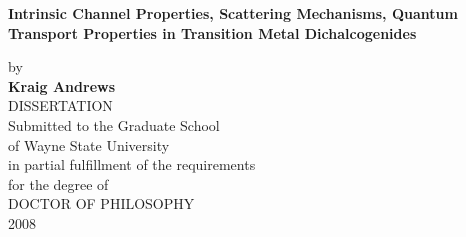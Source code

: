\setcounter{page}{1} 
\thispagestyle{empty}
\begin{titlepage}


	\begin{center}

	\singlespacing
	\textbf{Intrinsic Channel Properties, Scattering Mechanisms, Quantum Transport Properties in Transition Metal Dichalcogenides}\\
	\doublespacing
	
	by\\
	
	\textbf{Kraig Andrews}\\
	DISSERTATION\\
	

	
	
	
	Submitted to the Graduate School\\
	
        of Wayne State University\\
	in partial fulfillment of the requirements\\
	for the degree of\\
	\vspace{0.8cm}
	DOCTOR OF PHILOSOPHY\\

	2008\\
	\end{center}
	\begin{flushright}
	\\
   \vspace{1.0cm}
	 \\
   \vspace{0.7cm}
	\makebox[8.7cm][l]{$\overline {\hspace{7.8cm}}$} \\
   \vspace{0.9cm}
	\makebox[8.7cm][l]{$\overline {\hspace{7.8cm}}$} \\
   \vspace{0.9cm}
	\makebox[8.7cm][l]{$\overline {\hspace{7.8cm}}$} \\
	
	\end{flushright}

	\end{titlepage}
